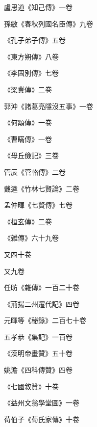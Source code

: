 \begin{pinyinscope}
 盧思道《知己傳》一卷



 孫敏《春秋列國名臣傳》九卷



 《孔子弟子傳》五卷



 《東方朔傳》八卷



 《李固別傳》七卷



 《梁冀傳》二卷



 郭沖《諸葛亮隱沒五事》一卷



 《何顒傳》一卷



 《曹瞞傳》一卷



 《毋丘儉記》三卷



 管辰《管輅傳》二卷



 戴逵《竹林七賢論》二卷



 孟仲暉《七賢傳》七卷



 《桓玄傳》二卷



 《雜傳》六十九卷



 又四十卷



 又九卷



 任昉《雜傳》一百二十卷



 《荊揚二州遷代記》四卷



 元暉等《秘錄》二百七十卷



 五孝恭《集記》一百卷



 《漢明帝畫贊》五十卷



 姚澹《四科傳贊》四卷



 《七國敘贊》十卷



 《益州文翁學堂圖》一卷



 荀伯子《荀氏家傳》十卷




\end{pinyinscope}
